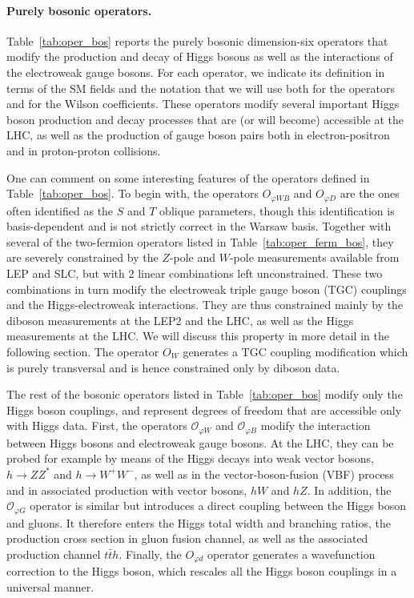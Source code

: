 \paragraph{Purely bosonic operators.}
%
Table~\ref{tab:oper_bos} reports the purely bosonic dimension-six operators that
modify the production and decay of Higgs bosons as well as the interactions
of the electroweak gauge bosons.
%
For each operator, we indicate its definition in terms of the SM fields
and the notation that we will use both
for the operators and for the Wilson coefficients.
%
These operators modify several important Higgs boson production and decay processes
that are (or will become) accessible at the LHC, as well as the production
of gauge boson pairs both in electron-positron and in proton-proton collisions.



One can comment on some interesting features of the operators defined
in Table~\ref{tab:oper_bos}.
%
To begin with, the operators $O_{\varphi WB}$ and $O_{\varphi D}$ are the ones
often identified as the $S$ and $T$ oblique parameters, though this
identification is basis-dependent and is not strictly correct in the Warsaw
basis.
%
Together with several of the two-fermion operators listed in Table~\ref{tab:oper_ferm_bos}, they are severely
constrained by the $Z$-pole and $W$-pole measurements available from LEP and
SLC, but with 2 linear combinations left unconstrained. These two combinations
in turn modify the electroweak triple gauge boson (TGC) couplings and the Higgs-electroweak
interactions.  They are thus constrained mainly by the diboson measurements
at the LEP2 and the LHC, as well as the Higgs measurements at the LHC. We will
discuss this property in more detail in the following section.
%
The operator $O_{W}$ generates a TGC coupling modification which is purely transversal
and is hence constrained only by diboson data.

The rest of the bosonic operators listed in Table~\ref{tab:oper_bos} modify only the Higgs boson couplings, and represent 
degrees of freedom that are accessible only with Higgs data.
First, the operators $\mathcal{O}_{\varphi W}$ and $\mathcal{O}_{\varphi B}$
modify the interaction between Higgs bosons and electroweak gauge bosons. 
%
At the LHC, they can be probed for example by means of the Higgs decays into
weak vector bosons, $h\to ZZ^*$ and $h \to W^+W^-$, as well as in the
vector-boson-fusion (VBF) process and in associated production with vector bosons, $hW$
and $hZ$.
%
In addition, the $\mathcal{O}_{\varphi G}$ operator is similar but 
introduces a direct coupling between the Higgs boson and gluons.
It therefore enters the Higgs total width and branching ratios,
the production cross section in gluon fusion channel, 
as well as the associated production channel $t\bar{t}h$.
Finally, the $O_{\varphi d}$ operator generates a wavefunction correction to the
Higgs boson, which rescales all the Higgs boson couplings in a universal manner.

